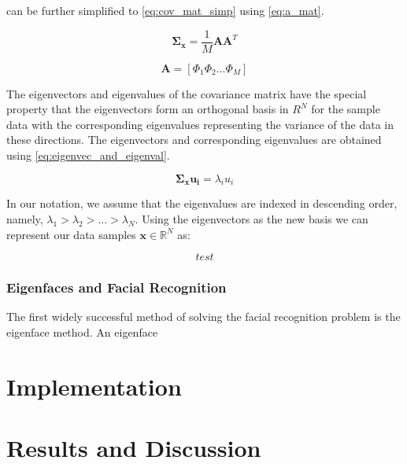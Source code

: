 \documentclass[headings=optiontoheadandtoc,listof=totoc,parskip=full]{scrartcl}
\def \reals {\mathbb{R}}
\begin{document}
 can be further simplified to \cref{eq:cov_mat_simp} using \cref{eq:a_mat}.

\begin{equation}\label{eq:cov_mat_simp}
    \mathbf{\Sigma_x} = \frac{1}{M}\mathbf{A}\mathbf{A}^T
\end{equation}

\begin{equation}\label{eq:a_mat}
    \mathbf{A} = [\Phi_1 \Phi_2 ... \Phi_M]    
\end{equation}

The eigenvectors and eigenvalues of the covariance matrix have the special property that the eigenvectors form an orthogonal basis in $R^N$ for the sample data with the corresponding eigenvalues representing the variance of the data in these directions. The eigenvectors and corresponding eigenvalues are obtained using \cref{eq:eigenvec_and_eigenval}.

\begin{equation}\label{eq:eigenvec_and_eigenval}
    \mathbf{\Sigma_x}\mathbf{u_i} = \lambda_iu_i
\end{equation}

In our notation, we assume that the eigenvalues are indexed in descending order, namely, $\lambda_1 > \lambda_2 > ... > \lambda_N$. Using the eigenvectors as the new basis we can represent our data samples $\mathbf{x} \in \reals^N$ as:

\begin{equation}
    test
\end{equation}

\subsubsection{Eigenfaces and Facial Recognition}

The first widely successful method of solving the facial recognition problem is the eigenface method. An eigenface


\section{Implementation}
\section{Results and Discussion}
\end{document}
